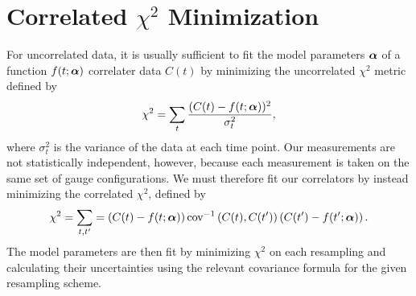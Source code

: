 \section{Correlated $\chi^2$ Minimization}
For uncorrelated data, it is usually sufficient to fit the model parameters $\boldsymbol{\alpha}$ of a function $f(t;\boldsymbol{\alpha})$ correlater data $C(t)$ by minimizing the uncorrelated $\chi^2$ metric defined by
\begin{equation}
    \chi^{2}=\sum_{t} \frac{(C(t)-f(t;\boldsymbol{\alpha}))^{2}}{\sigma_{t}^{2}},
\end{equation}
where $\sigma_t^2$ is the variance of the data at each time point. Our measurements are not statistically independent, however, because each measurement is taken on the same set of gauge configurations. We must therefore fit our correlators by instead minimizing the correlated $\chi^2$, defined by
\begin{equation}\label{eq:corr_chisq}
    \chi^{2}= \sum_{t,t^\prime} = \left(C(t) - f(t;\boldsymbol{\alpha})\right)\operatorname{cov}^{-1}\left(C(t), C(t^\prime)\right)\left(C(t^\prime) - f(t^\prime; \boldsymbol{\alpha})\right).
\end{equation}
The model parameters are then fit by minimizing $\chi^2$ on each resampling and calculating their uncertainties using the relevant covariance formula for the given resampling scheme.